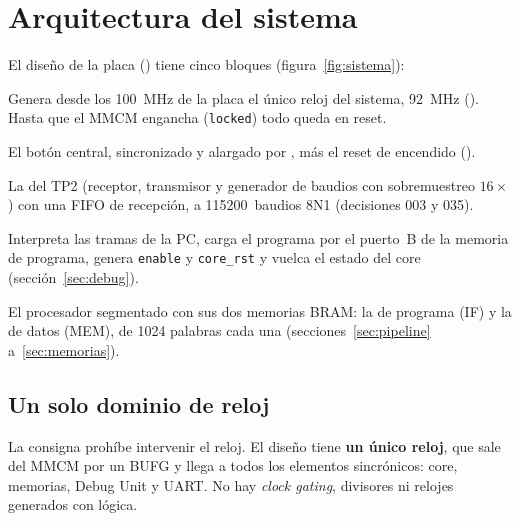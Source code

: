 \section{Arquitectura del sistema}
\label{sec:sistema}


El diseño de la placa () tiene cinco bloques
(figura~\ref{fig:sistema}):

\begin{description}[style=nextline,nosep,leftmargin=1.2em]
  \item[Clock Wizard (MMCM)] Genera desde los \qty{100}{\mega\hertz} de la placa el único reloj
        del sistema, \qty{92}{\mega\hertz} (). Hasta que el MMCM engancha
        (\texttt{locked}) todo queda en reset.
  \item[Reset] El botón central, sincronizado y alargado por ,
        más el reset de encendido ().
  \item[UART] La del TP2 (receptor, transmisor y generador de baudios con sobremuestreo
        $16\times$) con una FIFO de recepción, a 115200~baudios 8N1 (decisiones 003 y 035).
  \item[Debug Unit] Interpreta las tramas de la PC, carga el programa por el puerto~B de la
        memoria de programa, genera \texttt{enable} y \texttt{core\_rst} y vuelca el estado del
        core (sección~\ref{sec:debug}).
  \item[Core] El procesador segmentado con sus dos memorias BRAM: la de programa (IF) y la de
        datos (MEM), de 1024 palabras cada una (secciones~\ref{sec:pipeline}
        a~\ref{sec:memorias}).
\end{description}

\subsection{Un solo dominio de reloj}

La consigna prohíbe intervenir el reloj. El diseño tiene \textbf{un único reloj}, que sale del
MMCM por un BUFG y llega a todos los elementos sincrónicos: core, memorias, Debug Unit y UART. No
hay \emph{clock gating}, divisores ni relojes generados con lógica.

